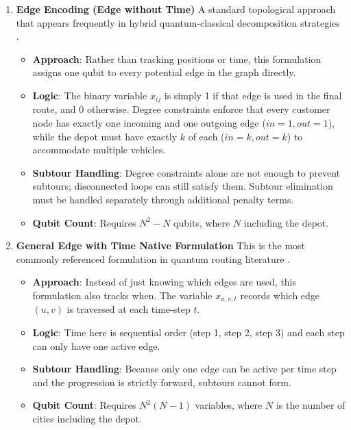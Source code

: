 \documentclass[a4paper]{report}
\begin{document}
{\begin{itemize}
\begin{enumerate}
    \item \textbf{Edge Encoding (Edge without Time)}
    A standard topological approach that appears frequently in hybrid 
    quantum-classical decomposition strategies \cite{maciejunes2025solving}.
    \begin{itemize}
        \item \textbf{Approach}: Rather than tracking positions or time, this 
        formulation assigns one qubit to every potential edge in the graph directly.
        \item \textbf{Logic}: The binary variable $x_{ij}$ is simply 1 if that 
        edge is used in the final route, and 0 otherwise. Degree constraints 
        enforce that every customer node has exactly one incoming and one outgoing 
        edge ($in=1, out=1$), while the depot must have exactly $k$ of each 
        ($in=k, out=k$) to accommodate multiple vehicles.
        \item \textbf{Subtour Handling}: Degree constraints alone are not enough 
        to prevent subtours; disconnected loops can still satisfy them. Subtour 
        elimination must be handled separately through additional penalty terms.
        \item \textbf{Qubit Count}: Requires $N^2 - N$ qubits, where $N$ including the depot.
    \end{itemize}
    
    \item \textbf{General Edge with Time Native Formulation}
    This is the most commonly referenced formulation in quantum routing 
    literature \cite{bermejo2022gps}.
    \begin{itemize}
        \item \textbf{Approach}: Instead of just knowing which edges are used, 
        this formulation also tracks when. The variable $x_{u,v,t}$ records 
        which edge $(u,v)$ is traversed at each time-step $t$.
        \item \textbf{Logic}: Time here is sequential order (step 1, step 2, 
        step 3) and each step can only have one active edge.
        \item \textbf{Subtour Handling}: Because only one edge can be active per 
        time step and the progression is strictly forward, subtours cannot form. 
        \item \textbf{Qubit Count}: Requires $N^2(N-1)$ variables, where $N$ is the 
        number of cities including the depot.
    \end{itemize}


\end{enumerate}
\end{itemize}}
\end{document}
